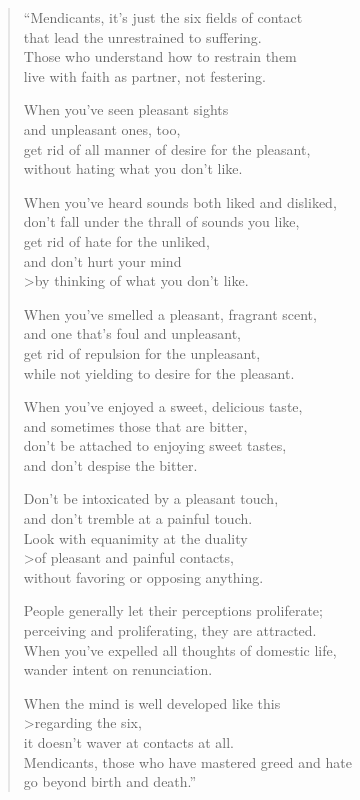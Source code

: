 \documentclass[12pt,openany]{book}%
\begin{document}
\begin{verse}%
“Mendicants, it’s just the six fields of contact \\
that lead the unrestrained to suffering. \\
Those who understand how to restrain them \\
live with faith as partner, not festering. 

When you’ve seen pleasant sights \\
and unpleasant ones, too, \\
get rid of all manner of desire for the pleasant, \\
without hating what you don’t like. 

When you’ve heard sounds both liked and disliked, \\
don’t fall under the thrall of sounds you like, \\
get rid of hate for the unliked, \\
and don’t hurt your mind \\>by thinking of what you don’t like. 

When you’ve smelled a pleasant, fragrant scent, \\
and one that’s foul and unpleasant, \\
get rid of repulsion for the unpleasant, \\
while not yielding to desire for the pleasant. 

When you’ve enjoyed a sweet, delicious taste, \\
and sometimes those that are bitter, \\
don’t be attached to enjoying sweet tastes, \\
and don’t despise the bitter. 

Don’t be intoxicated by a pleasant touch, \\
and don’t tremble at a painful touch. \\
Look with equanimity at the duality \\>of pleasant and painful contacts, \\
without favoring or opposing anything. 

People generally let their perceptions proliferate; \\
perceiving and proliferating, they are attracted. \\
When you’ve expelled all thoughts of domestic life, \\
wander intent on renunciation. 

When the mind is well developed like this \\>regarding the six, \\
it doesn’t waver at contacts at all. \\
Mendicants, those who have mastered greed and hate \\
go beyond birth and death.” 

%
\end{verse}
\end{document}
